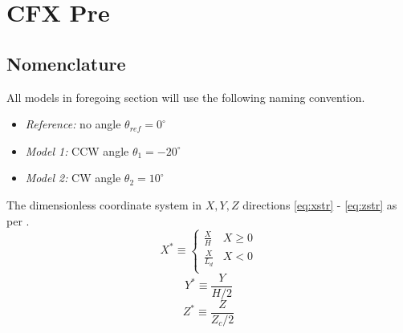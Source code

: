 \chapter{CFX Pre}
\label{ch:pre}

\section{Nomenclature}
\label{sec:nomenclature}

All models in foregoing section will use the following naming convention.
\begin{itemize}
	\item \textit{Reference:} no angle $\theta_{ref}=0^{\circ}$ 
	\item \textit{Model 1:} CCW angle $\theta_1=-20^{\circ}$ 
	\item \textit{Model 2:} CW angle $\theta_2=10^{\circ}$
\end{itemize}

The dimensionless coordinate system in $X,Y,Z$ directions \ref{eq:xstr} - \ref{eq:zstr} as per \cite{art}.
\begin{equation}
	X^* \equiv
	\begin{cases}
		\frac{X}{H}   & X\geq 0 \\
		\frac{X}{L_d} & X < 0   \\
	\end{cases}
	\label{eq:xstr}
\end{equation}
\begin{equation}
	\label{eq:ystr}
	Y^* \equiv \frac{Y}{H/2}
\end{equation}
\begin{equation}
	\label{eq:zstr}
	Z^* \equiv \frac{Z}{Z_c /2}
\end{equation}

